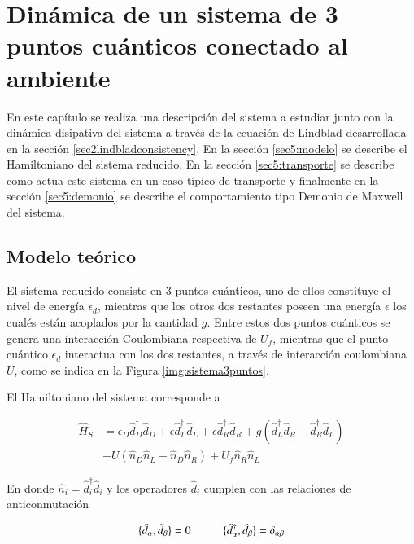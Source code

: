 \chapter{Dinámica de un sistema de 3 puntos cuánticos conectado al ambiente}
En este capítulo se realiza una descripción del sistema a estudiar junto con la dinámica disipativa del sistema a través de la ecuación de Lindblad desarrollada en la sección \ref{sec2lindbladconsistency}. En la sección \ref{sec5:modelo} se describe el Hamiltoniano del sistema reducido.  En la sección \ref{sec5:transporte} se describe como actua este sistema en un caso típico de transporte y finalmente en la sección \ref{sec5:demonio} se describe el comportamiento tipo Demonio de Maxwell del sistema.

\section{Modelo teórico}
El sistema reducido consiste en 3 puntos cuánticos, uno de ellos constituye el nivel de energía $\epsilon_{d}$, mientras que los otros dos restantes poseen una energía $\epsilon$ los cualés están acoplados por la cantidad $g$. Entre estos dos puntos cuánticos se genera una interacción Coulombiana respectiva de $U_{f}$, mientras que el punto cuántico $\epsilon_{d}$ interactua con los dos restantes, a través de interacción coulombiana $U$, como se indica en la Figura \ref{img:sistema3puntos}.



El Hamiltoniano del sistema corresponde a 

\begin{align*}
    \hat{H}_{S} & = \epsilon_{D}\hat{d}^{\dagger}_{D}\hat{d}_{D} + \epsilon \hat{d}^{\dagger}_{L}\hat{d}_{L} + \epsilon \hat{d}^{\dagger}_{R}\hat{d}_{R} + g(\hat{d}^{\dagger}_{L}\hat{d}_{R} + \hat{d}^{\dagger}_{R}\hat{d}_{L} ) \\
          & + U(\hat{n}_{D}\hat{n}_{L} + \hat{n}_{D}\hat{n}_{R} )  + U_{f}\hat{n}_{R}\hat{n}_{L} 
\end{align*}

En donde $\hat{n}_{i} = \hat{d}^{\dagger}_{i} \hat{d}_{i}$ y los operadores $\hat{d}_{i}$ cumplen con las relaciones de anticonmutación

\begin{equation*}
    \{\hat{d}_{\alpha},\hat{d}_{\beta} \} = 0  \hspace{10mm} \{\hat{d}^{\dagger}_{\alpha}, \hat{d}_{\beta} \} = \delta_{\alpha \beta}
\end{equation*}

